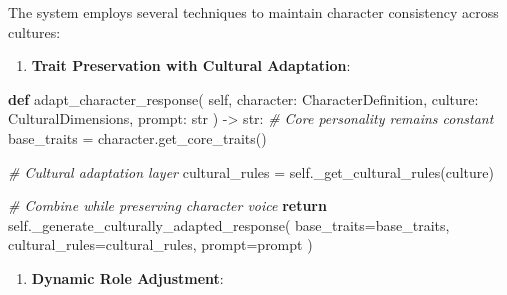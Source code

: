 \documentclass[
]{article}
\newenvironment{Shaded}{}{}
\newcommand{\BuiltInTok}[1]{\textcolor[rgb]{0.00,0.50,0.00}{#1}}
\newcommand{\CommentTok}[1]{\textcolor[rgb]{0.38,0.63,0.69}{\textit{#1}}}
\newcommand{\ControlFlowTok}[1]{\textcolor[rgb]{0.00,0.44,0.13}{\textbf{#1}}}
\newcommand{\KeywordTok}[1]{\textcolor[rgb]{0.00,0.44,0.13}{\textbf{#1}}}
\newcommand{\NormalTok}[1]{#1}
\newcommand{\OperatorTok}[1]{\textcolor[rgb]{0.40,0.40,0.40}{#1}}
\newcommand{\VariableTok}[1]{\textcolor[rgb]{0.10,0.09,0.49}{#1}}
\providecommand{\tightlist}{%
  \setlength{\itemsep}{0pt}\setlength{\parskip}{0pt}}
\begin{document}
The system employs several techniques to maintain character consistency
across cultures:

\begin{enumerate}
\def\labelenumi{\arabic{enumi}.}
\tightlist
\item
  \textbf{Trait Preservation with Cultural Adaptation}:
\end{enumerate}

\begin{Shaded}
\begin{Highlighting}[]
\KeywordTok{def}\NormalTok{ adapt\_character\_response(}
    \VariableTok{self}\NormalTok{,}
\NormalTok{    character: CharacterDefinition,}
\NormalTok{    culture: CulturalDimensions,}
\NormalTok{    prompt: }\BuiltInTok{str}
\NormalTok{) }\OperatorTok{{-}\textgreater{}} \BuiltInTok{str}\NormalTok{:}
    \CommentTok{\# Core personality remains constant}
\NormalTok{    base\_traits }\OperatorTok{=}\NormalTok{ character.get\_core\_traits()}
    
    \CommentTok{\# Cultural adaptation layer}
\NormalTok{    cultural\_rules }\OperatorTok{=} \VariableTok{self}\NormalTok{.\_get\_cultural\_rules(culture)}
    
    \CommentTok{\# Combine while preserving character voice}
    \ControlFlowTok{return} \VariableTok{self}\NormalTok{.\_generate\_culturally\_adapted\_response(}
\NormalTok{        base\_traits}\OperatorTok{=}\NormalTok{base\_traits,}
\NormalTok{        cultural\_rules}\OperatorTok{=}\NormalTok{cultural\_rules,}
\NormalTok{        prompt}\OperatorTok{=}\NormalTok{prompt}
\NormalTok{    )}
\end{Highlighting}
\end{Shaded}

\begin{enumerate}
\def\labelenumi{\arabic{enumi}.}
\setcounter{enumi}{1}
\tightlist
\item
  \textbf{Dynamic Role Adjustment}:
\end{enumerate}
\end{document}

